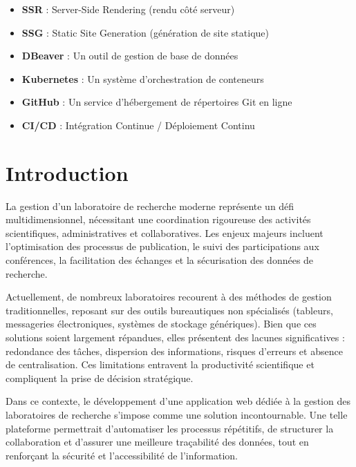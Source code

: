 \documentclass{rapportPfe}
\begin{document}
\begin{itemize}
	  \item \textbf{SSR} : Server-Side Rendering (rendu côté serveur)
	  \item \textbf{SSG} : Static Site Generation (génération de site statique)
	  \item \textbf{DBeaver} : Un outil de gestion de base de données
	  \item \textbf{Kubernetes} : Un système d'orchestration de conteneurs
	  \item \textbf{GitHub} : Un service d'hébergement de répertoires Git en ligne
	  \item \textbf{CI/CD} : Intégration Continue / Déploiement Continu
	\end{itemize}

\newpage
\chapter*{Introduction}

La gestion d’un laboratoire de recherche moderne représente un défi multidimensionnel, nécessitant une coordination rigoureuse des activités scientifiques, administratives et collaboratives. Les enjeux majeurs incluent l’optimisation des processus de publication, le suivi des participations aux conférences, la facilitation des échanges et la sécurisation des données de recherche.

Actuellement, de nombreux laboratoires recourent à des méthodes de gestion traditionnelles, reposant sur des outils bureautiques non spécialisés (tableurs, messageries électroniques, systèmes de stockage génériques). Bien que ces solutions soient largement répandues, elles présentent des lacunes significatives : redondance des tâches, dispersion des informations, risques d’erreurs et absence de centralisation. Ces limitations entravent la productivité scientifique et compliquent la prise de décision stratégique.

Dans ce contexte, le développement d’une application web dédiée à la gestion des laboratoires de recherche s’impose comme une solution incontournable. Une telle plateforme permettrait d’automatiser les processus répétitifs, de structurer la collaboration et d’assurer une meilleure traçabilité des données, tout en renforçant la sécurité et l’accessibilité de l’information.

\newpage
\tabledematieres

\newpage
\listoffigures

\newpage
\listoftables
\end{document}
